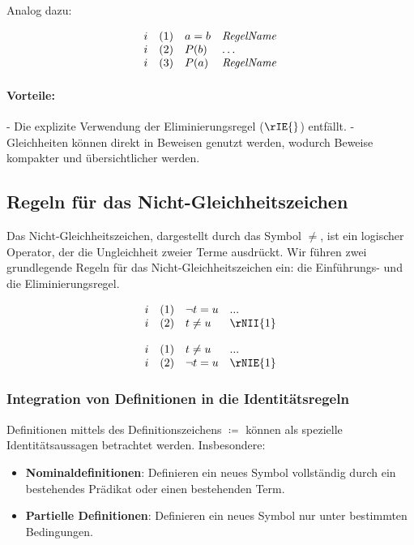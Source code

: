 \documentclass{book}
\theoremstyle{plain}
\theoremstyle{remark}
\theoremstyle{definition}
\begin{document}
Analog dazu:

\[
\begin{array}{llll}
	i & (1) & a = b & \text{\textit{RegelName}} \\
	i & (2) & P(b) & \dots \\
	i & (3) & P(a) & \text{\textit{RegelName}} \\
\end{array}
\]

\paragraph{Vorteile:}
- Die explizite Verwendung der Eliminierungsregel (\(\rIE{}\)) entfällt.
- Gleichheiten können direkt in Beweisen genutzt werden, wodurch Beweise kompakter und übersichtlicher werden.



\subsection{Regeln für das Nicht-Gleichheitszeichen}
\label{rule:NII} \label{rule:NIE}
Das Nicht-Gleichheitszeichen, dargestellt durch das Symbol \(\neq\), ist ein logischer Operator, der die Ungleichheit zweier Terme ausdrückt. Wir führen zwei grundlegende Regeln für das Nicht-Gleichheitszeichen ein: die Einführungs- und die Eliminierungsregel.

\[
\begin{array}{llll}
	i & (1) & \neg t = u & \text{...} \\
	i & (2) & t \neq u & \rNII{1} \\
\end{array}
\]

\[
\begin{array}{llll}
	i & (1) & t \neq u & \text{...} \\
	i & (2) & \neg t = u & \rNIE{1} \\
\end{array}
\]

\subsubsection{Integration von Definitionen in die Identitätsregeln}

Definitionen mittels des Definitionszeichens \( \coloneqq \) können als spezielle Identitätsaussagen betrachtet werden. Insbesondere:

\begin{itemize}
	\item \textbf{Nominaldefinitionen}: Definieren ein neues Symbol vollständig durch ein bestehendes Prädikat oder einen bestehenden Term.
	\item \textbf{Partielle Definitionen}: Definieren ein neues Symbol nur unter bestimmten Bedingungen.
\end{itemize}
\end{document}
